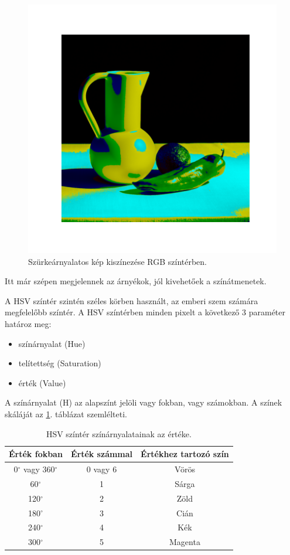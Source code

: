 \begin{figure}[h]
\centering
\includegraphics[scale=0.7]{images/colorized_rgb.png}
\caption{Szürkeárnyalatos kép kiszínezése RGB színtérben.}
\label{fig:colorized_rgb}
\end{figure}

Itt már szépen megjelennek az árnyékok, jól kivehetőek a színátmenetek.


A HSV színtér szintén széles körben használt, az emberi szem számára megfelelőbb színtér. A HSV színtérben minden pixelt a következő 3 paraméter határoz meg:
\begin{itemize}
\item színárnyalat (Hue)
\item telítettség (Saturation)
\item érték (Value)
\end{itemize}

A színárnyalat (H) az alapszínt jelöli vagy fokban, vagy számokban. A színek skáláját az \ref{tab:hsv_colors}. táblázat szemlélteti.

\begin{table}[h]
\centering
\caption{HSV színtér színárnyalatainak az értéke.}
\label{tab:hsv_colors}
\medskip
\begin{tabular}{|c|c|c|}
\hline
Érték fokban & Érték számmal & Értékhez tartozó szín \\
\hline
0$^{\circ}$ vagy 360$^{\circ}$ & 0 vagy 6 & Vörös \\
\hline
60$^{\circ}$ & 1 & Sárga \\
\hline
120$^{\circ}$ & 2 & Zöld \\
\hline
180$^{\circ}$ & 3 & Cián \\
\hline
240$^{\circ}$ & 4 & Kék \\
\hline
300$^{\circ}$ & 5 & Magenta \\
\hline
\end{tabular}
\end{table}

